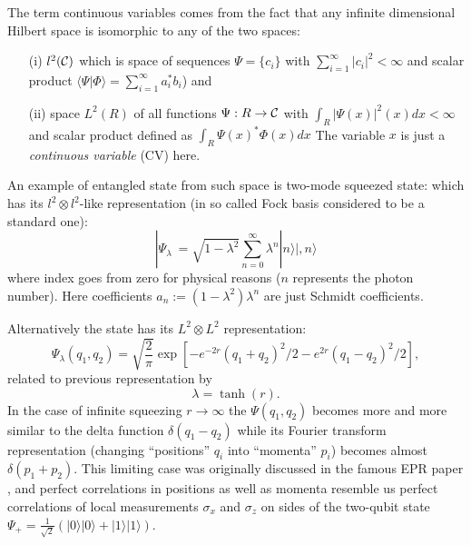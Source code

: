 \documentclass[twocolumn,aps,rmp]{revtex4}
\begin{document}
The term continuous variables comes from the fact that any infinite
dimensional Hilbert space is isomorphic to any of the two spaces:
\begin{itemize}
\item[(i)] $l^{2}({\cal C})$ which is space of sequences $\Psi=\{
  c_{i} \}$ with $\sum_{i=1}^{\infty} |c_{i}|^{2} < \infty $ and
  scalar product $\langle\Psi|\Phi\rangle=\sum_{i=1}^{\infty}
  a_{i}^{*}b_{i}$) and

\item[(ii)] space $L^{2}(R)$ of all functions $\Psi:R \rightarrow
  {\cal C}$ with $\int_{R}|\Psi(x)|^{2}(x)dx < \infty$ and scalar
  product defined as $\int_{R}\Psi(x)^{*} \Phi(x) dx $ The variable
  $x$ is just a {\it continuous variable} (CV) here.
\end{itemize}

An example of entangled state from such space is two-mode squeezed
state: which has its $l^{2}\otimes l^{2}$-like representation (in so
called Fock basis considered to be a standard one):
\begin{equation}
|\Psi_{\lambda}\>=\sqrt{1-\lambda^{2}}\sum_{n=0}^{\infty}\lambda^{n}|n\rangle|,
n \rangle \label{squeezed}
\end{equation}
where index goes from zero for physical reasons ($n$ represents the
photon number). Here coefficients $a_{n}:=(1-\lambda^{2})\lambda^{n}$
are just Schmidt coefficients.

Alternatively the state has its $L^{2}\otimes L^{2}$ representation:
\begin{equation}
\Psi_{\lambda}(q_1,q_2)=\sqrt{\frac{2}{\pi}}\exp[-e^{-2r}(q_1+q_2)^{2}/2
-e^{2r}(q_1-q_2)^{2}/2],
\end{equation}
related to previous representation  by
\begin{equation}
\lambda=\tanh(r).
\end{equation}
In the case of infinite squeezing $r \rightarrow \infty$ the
$\Psi(q_1,q_2)$ becomes more and more similar to the delta function
$\delta(q_{1} - q_{2})$ while its Fourier transform representation
(changing ``positions'' $q_{i}$ into ``momenta'' $p_{i}$) becomes
almost $\delta(p_{1} + p_{2})$. This limiting case was originally
discussed in the famous EPR paper \cite{EPR}, and perfect correlations
in positions as well as momenta resemble us perfect correlations of
local measurements $\sigma_{x}$ and $\sigma_{z}$ on sides of the
two-qubit state $\Psi_{+}=\frac{1}{\sqrt{2}}(|0\rangle|0\rangle +
|1\rangle| 1\rangle)$.
\end{document}
